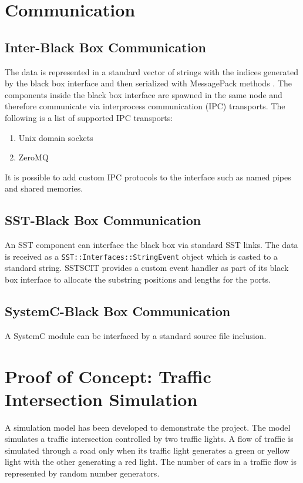 \documentclass{article}
\begin{document}
  \section{Communication}

    \subsection{Inter-Black Box Communication} \label{sec:ipc}
    The data is represented in a standard vector of strings with the indices generated by the black
    box interface and then serialized with MessagePack methods \cite{msgpack}. The components inside
    the black box interface are spawned in the same node and therefore communicate via interprocess
    communication (IPC) transports. The following is a list of supported IPC transports:
    \begin{enumerate}
      \item Unix domain sockets
      \item ZeroMQ
    \end{enumerate}

    It is possible to add custom IPC protocols to the interface such as named pipes and shared memories.

    \subsection{SST-Black Box Communication}
    An SST component can interface the black box via standard SST links. The data is received as a
    \lstinline{SST::Interfaces::StringEvent} object which is casted to a standard string. SSTSCIT
    provides a custom event handler as part of its black box interface to allocate the substring
    positions and lengths for the ports.

    \subsection{SystemC-Black Box Communication}
    A SystemC module can be interfaced by a standard source file inclusion.

  \section{Proof of Concept: Traffic Intersection Simulation}
  A simulation model has been developed to demonstrate the project. The model simulates a traffic
  intersection controlled by two traffic lights. A flow of traffic is simulated through a road only
  when its traffic light generates a green or yellow light with the other generating a red light.
  The number of cars in a traffic flow is represented by random number generators.
\end{document}
